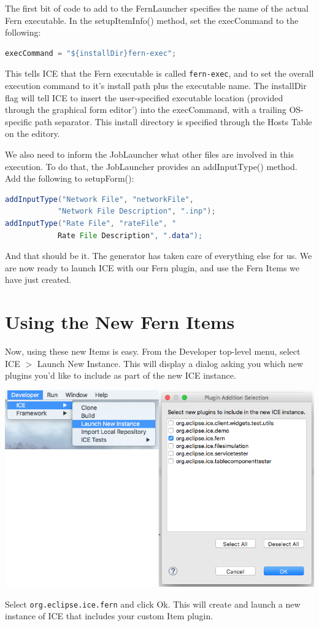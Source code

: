 The first bit of code to add to the FernLauncher specifies the name of the
actual Fern executable. In the setupItemInfo() method, set the execCommand to
the following: 
\begin{lstlisting}[language=Java]
execCommand = "${installDir}fern-exec";
\end{lstlisting}
This tells ICE that the Fern executable is called \texttt{fern-exec}, and to
set the overall execution command to it's install path plus the executable name.
The installDir flag will tell ICE to insert the user-specified executable
location (provided through the graphical form editor') into the execCommand,
with a trailing OS-specific path separator. This install directory is
specified through the Hosts Table on the editory. 

We also need to inform the JobLauncher what other files are involved in this
execution. To do that, the JobLauncher provides an addInputType() method. Add
the following to setupForm():
\begin{lstlisting}[language=Java]
addInputType("Network File", "networkFile", 
			"Network File Description", ".inp");
addInputType("Rate File", "rateFile", "
			Rate File Description", ".data");
\end{lstlisting}

And that should be it.
The generator has taken care of everything else for us.
We are now ready to launch ICE with our Fern plugin, and use the Fern Items we
have just created.

\section{Using the New Fern Items}
Now, using these new Items is easy. From the Developer top-level menu, select 
ICE $>$ Launch New Instance. This will display a dialog asking you which new
plugins you'd like to include as part of the new ICE instance. 
\begin{center} \includegraphics[width=\textwidth]{figures/combdev}
\end{center}
Select \texttt{org.eclipse.ice.fern} and click Ok. This will create and launch a
new instance of ICE that includes your custom Item plugin. 

